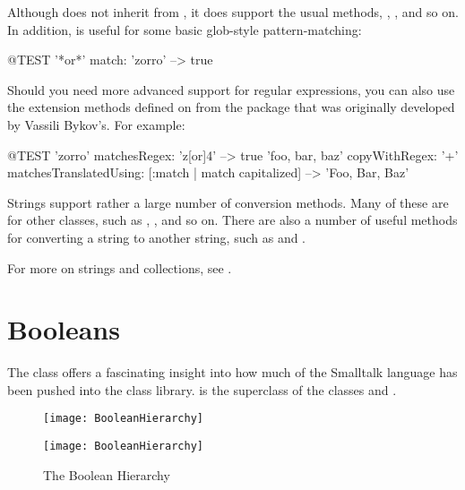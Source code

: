 \documentclass[a4paper,10pt,twoside]{book}
\begin{document}

Although  does not inherit from , it does support the usual  methods, \ct{<}, \ct{=}, and so on.
In addition,  is useful for some basic glob-style pattern-matching:

\begin{code}{@TEST}
'*or*' match: 'zorro' --> true
\end{code}

Should you need more advanced support for regular expressions, you can also use the  extension methods defined on  from the  package that was originally developed by Vassili Bykov's.
For example:

\begin{code}{@TEST}
'zorro' matchesRegex: 'z[or]{4}' --> true
'foo, bar, baz' copyWithRegex: '\w+' matchesTranslatedUsing: [:match | match capitalized] --> 'Foo, Bar, Baz'
\end{code}

Strings support rather a large number of conversion methods.
Many of these are  for other classes, such as , , and so on.
There are also a number of useful methods for converting a string to another string, such as  and .

For more on strings and collections, see .


\section{Booleans}

The class  offers a fascinating insight into how much of the Smalltalk language has been pushed into the class library.
 is the  superclass of the  classes  and .

\begin{figure}[ht]
\ifluluelse
	{\centerline {\texttt{[image: BooleanHierarchy]}}}
	{\centerline {\texttt{[image: BooleanHierarchy]}}}
\caption{The Boolean Hierarchy \label{fig:booleans}}
\end{figure}
\end{document}
